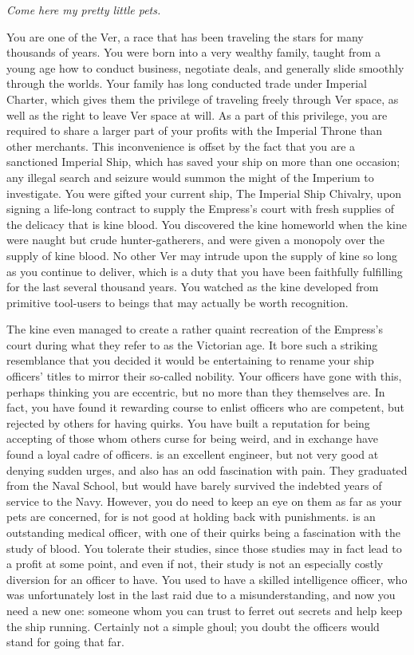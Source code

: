 \documentclass[char]{guildcamp4}
\begin{document}
\name{\cVone{}}


\textit{Come here my pretty little pets.}

You are one of the Ver, a race that has been traveling the stars for many thousands of years. You were born into a very wealthy family, taught from a young age how to conduct business, negotiate deals, and generally slide smoothly through the worlds. Your family has long conducted trade under Imperial Charter, which gives them the privilege of traveling freely through Ver space, as well as the right to leave Ver space at will. As a part of this privilege, you are required to share a larger part of your profits with the Imperial Throne than other merchants. This inconvenience is offset by the fact that you are a sanctioned Imperial Ship, which has saved your ship on more than one occasion; any illegal search and seizure would summon the might of the Imperium to investigate. You were gifted your current ship, The Imperial Ship Chivalry, upon signing a life-long contract to supply the Empress's court with fresh supplies of the delicacy that is kine blood. You discovered the kine homeworld when the kine were naught but crude hunter-gatherers, and were given a monopoly over the supply of kine blood. No other Ver may intrude upon the supply of kine so long as you continue to deliver, which is a duty that you have been faithfully fulfilling for the last several thousand years. You watched as the kine developed from primitive tool-users to beings that may actually be worth recognition. 

The kine even managed to create a rather quaint recreation of the Empress's court during what they refer to as the Victorian age. It bore such a striking resemblance that you decided it would be entertaining to rename your ship officers' titles to mirror their so-called nobility. Your officers have gone with this, perhaps thinking you are eccentric, but no more than they themselves are. In fact, you have found it rewarding course to enlist officers who are competent, but rejected by others for having quirks. You have built a reputation for being accepting of those whom others curse for being weird, and in exchange have found a loyal cadre of officers. \cVtwo{} is an excellent engineer, but not very good at denying sudden urges, and also has an odd fascination with pain. They graduated from the Naval School, but would have barely survived the indebted years of service to the Navy. However, you do need to keep an eye on them as far as your pets are concerned, for \cVtwo{} is not good at holding back with punishments. \cVthree{} is an outstanding medical officer, with one of their quirks being a fascination with the study of blood. You tolerate their studies, since those studies may in fact lead to a profit at some point, and even if not, their study is not an especially costly diversion for an officer to have. You used to have a skilled intelligence officer, who was unfortunately lost in the last raid due to a misunderstanding, and now you need a new one: someone whom you can trust to ferret out secrets and help keep the ship running. Certainly not a simple ghoul; you doubt the officers would stand for going that far.
\end{document}
